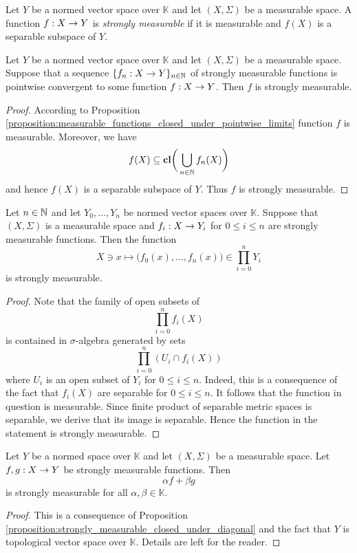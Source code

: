 \begin{definition}
    Let $Y$ be a normed vector space over $\mathbb{K}$ and let $(X,\Sigma)$ be a measurable space. A function $f:X\rightarrow Y$ is \textit{strongly measurable} if it is measurable and $f(X)$ is a separable subspace of $Y$.
\end{definition}

\begin{proposition}\label{proposition:strongly_measurable_functions_closed_under_pointwise_limits}
    Let $Y$ be a normed vector space over $\mathbb{K}$ and let $(X,\Sigma)$ be a measurable space. Suppose that a sequence $\{f_n:X\rightarrow Y\}_{n\in {\mathbb N}}$ of strongly measurable functions is pointwise convergent to some function $f:X\rightarrow Y$. Then $f$ is strongly measurable.
\end{proposition}
\begin{proof}
    According to Proposition \ref{proposition:measurable_functions_closed_under_pointwise_limits} function $f$ is measurable. Moreover, we have
    $$f(X) \subseteq \mathbf{cl}\bigg(\bigcup_{n\in {\mathbb N}}f_n(X)\bigg)$$
    and hence $f(X)$ is a separable subspace of $Y$. Thus $f$ is strongly measurable.
\end{proof}

\begin{proposition}\label{proposition:strongly_measurable_closed_under_diagonal}
    Let $n\in {\mathbb N}$ and let $Y_0, ...,Y_n$ be normed vector spaces over $\mathbb{K}$. Suppose that $(X,\Sigma)$ is a measurable space and $f_i:X\rightarrow Y_i$ for $0 \leq i \leq n$ are strongly measurable functions. Then the function
    $$X\ni x \mapsto \bigg(f_0(x),...,f_n(x)\bigg) \in \prod_{i=0}^nY_i$$
    is strongly measurable.
\end{proposition}
\begin{proof}
    Note that the family of open subsets of
    $$\prod_{i=0}^nf_i(X)$$
    is contained in $\sigma$-algebra generated by sets
    $$\prod_{i=0}^n\left(U_i\cap f_i(X)\right)$$
    where $U_i$ is an open subset of $Y_i$ for $0\leq i \leq n$. Indeed, this is a consequence of the fact that $f_i(X)$ are separable for $0\leq i\leq n$. It follows that the function in question is measurable. Since finite product of separable metric spaces is separable, we derive that its image is separable. Hence the function in the statement is strongly measurable.
\end{proof}

\begin{corollary}\label{corollary:strongly_measurable_form_vector_space}
    Let $Y$ be a normed space over $\mathbb{K}$ and let $(X,\Sigma)$ be a measurable space. Let $f, g:X\rightarrow Y$ be strongly measurable functions. Then
    $$\alpha f + \beta g$$
    is strongly measurable for all $\alpha,\beta \in \mathbb{K}$.
\end{corollary}
\begin{proof}
    This is a consequence of Proposition \ref{proposition:strongly_measurable_closed_under_diagonal} and the fact that $Y$ is topological vector space over $\mathbb{K}$. Details are left for the reader.
\end{proof}

